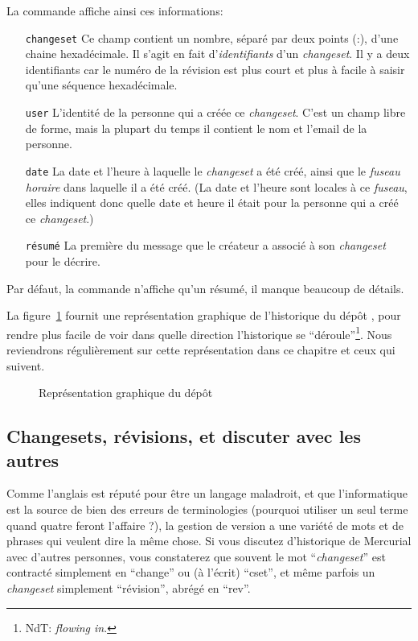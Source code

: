 La commande  affiche ainsi ces informations:
\begin{itemize}
\item[\texttt{changeset}] Ce champ contient un nombre, séparé par deux points
  (:), d'une chaine hexadécimale. Il s'agit en fait d'\emph{identifiants}
  d'un \textit{changeset}. Il y a deux identifiants car le numéro de
  la révision est plus court et plus à facile à saisir qu'une séquence
  hexadécimale.
\item[\texttt{user}] L'identité de la personne qui a créée ce  %
  \textit{changeset}. C'est un champ libre de forme, mais la plupart du
  temps il contient le nom et l'email de la personne.
\item[\texttt{date}] La date et l'heure à laquelle le \textit{changeset}
  a été créé, ainsi que le \textit{fuseau horaire} dans laquelle il a été créé. %
  (La date et l'heure sont locales à ce \textit{fuseau}, elles indiquent
  donc quelle date et heure il était pour la personne qui a créé ce %
  \textit{changeset}.)
\item[\texttt{résumé}] La première du message que le créateur a associé à
  son \textit{changeset} pour le décrire.
\end{itemize}

Par défaut, la commande  n'affiche qu'un résumé, il manque 
beaucoup de détails.

La figure~\ref{fig:tour-basic:history} fournit une représentation graphique
de l'historique du dépôt , pour rendre plus facile de voir
dans quelle direction l'historique se ``déroule''\footnote{NdT: \textit{flowing in}.}.
Nous reviendrons régulièrement sur cette représentation dans ce chapitre et
ceux qui suivent.

\begin{figure}[ht]
  \centering
  \caption{Représentation graphique du dépôt  }
  \label{fig:tour-basic:history}
\end{figure}

\subsection{Changesets, révisions, et discuter avec les autres}%

Comme l'anglais est réputé pour être un langage maladroit, et que l'informatique
est la source de bien des erreurs de terminologies (pourquoi utiliser un
seul terme quand quatre feront l'affaire ?), la gestion de version a une
variété de mots et de phrases qui veulent dire la même chose. Si vous 
discutez d'historique de Mercurial avec d'autres personnes, 
vous constaterez que souvent le mot ``\textit{changeset}'' est contracté simplement
en ``change'' ou (à l'écrit) ``cset'', et même parfois un 
\textit{changeset} simplement ``révision'', abrégé en ``rev''.

